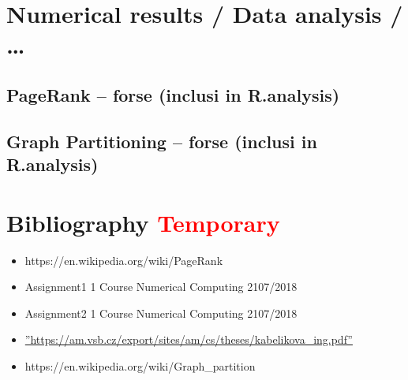 \documentclass[]{usiinfbachelorproject}
\begin{document}
\section{Numerical results / Data analysis / \ldots}

\subsection{PageRank -- forse (inclusi in R.analysis)}

\subsection{Graph Partitioning -- forse (inclusi in R.analysis)}

\newpage

\section{Bibliography  \textcolor{red}{Temporary}}
\begin{itemize}
\item https://en.wikipedia.org/wiki/PageRank
\item Assignment1 1 Course Numerical Computing 2107/2018
\item Assignment2 1 Course Numerical Computing 2107/2018
\item \hyperref[label_name]{''https://am.vsb.cz/export/sites/am/cs/theses/kabelikova\_ing.pdf''}
\item https://en.wikipedia.org/wiki/Graph\_partition
\end{itemize}









 
\end{document}
